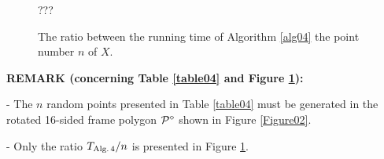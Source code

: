 \documentclass[12pt]{article}
\newcommand{\red}[1]{{\color{red} #1 }}
\begin{document}
\begin{figure}[ht]
	\centering
	???
	\caption{The ratio between the running time of Algorithm \ref{alg04} the point number $n$ of $X$.}
	\label{Figure04}
\end{figure}


\red{
\bigskip\noindent
{\bf REMARK (concerning Table \ref{table04} and Figure \ref{Figure04}):} 

 - The $n$ random points presented in Table \ref{table04} must be generated in the rotated 16-sided frame polygon ${\cal P}^\diamond$ shown in Figure \ref{Figure02}.
 
 - Only the ratio $T_{\rm Alg.\, 4}/n$ is presented in Figure \ref{Figure04}.

\bigskip
} 
\end{document}
